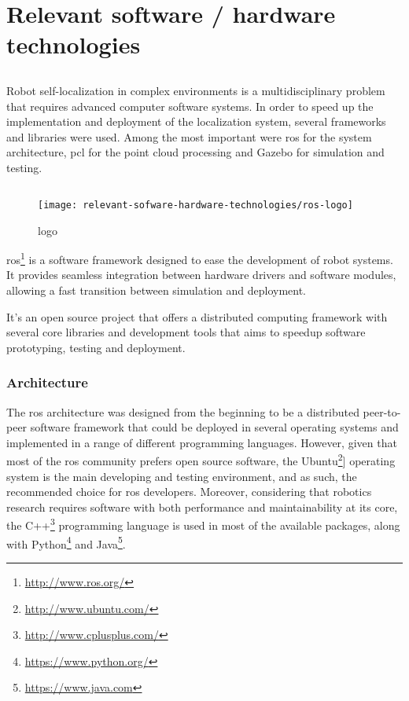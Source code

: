 \chapter{Relevant software / hardware technologies}\label{chap:relevant-sofware-hardware-technologies}



\section*{}

Robot self-localization in complex environments is a multidisciplinary problem that requires advanced computer software systems. In order to speed up the implementation and deployment of the localization system, several frameworks and libraries were used. Among the most important were \gls{ros} for the system architecture, \gls{pcl} for the point cloud processing and Gazebo for simulation and testing.



\section{}

\begin{wrapfigure}{r}{0.25\textwidth}
	\centering
	\texttt{[image: relevant-sofware-hardware-technologies/ros-logo]}
	\caption{ logo}
	\label{fig:relevant-sofware-hardware-technologies_ros-logo}
\end{wrapfigure}

\gls{ros}\footnote{\url{http://www.ros.org/}} \cite{Quigley2009} is a software framework designed to ease the development of robot systems. It provides seamless integration between hardware drivers and software modules, allowing a fast transition between simulation and deployment.

It's an open source project that offers a distributed computing framework with several core libraries and development tools that aims to speedup software prototyping, testing and deployment.


\subsection{Architecture}

The \gls{ros} architecture was designed from the beginning to be a distributed peer-to-peer software framework that could be deployed in several operating systems and implemented in a range of different programming languages. However, given that most of the \gls{ros} community prefers open source software, the Ubuntu\footnote{\url{http://www.ubuntu.com/}}] operating system is the main developing and testing environment, and as such, the recommended choice for \gls{ros} developers. Moreover, considering that robotics research requires software with both performance and maintainability at its core, the C++\footnote{\url{http://www.cplusplus.com/}} programming language is used in most of the available packages, along with Python\footnote{\url{https://www.python.org/}} and Java\footnote{\url{https://www.java.com}}.

